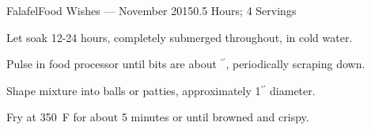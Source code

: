 \documentclass{article}
\begin{document}
\begin{recipe}{Falafel}{Food Wishes --- November 2015}{0.5 Hours; 4 Servings}

   Let soak 12-24 hours, completely submerged throughout, in cold water.

   Pulse in food processor until bits are about $^{\prime\prime}$,
   periodically scraping down.

   \newstep
   Shape mixture into balls or patties, approximately 1$^{\prime\prime}$
   diameter. 

   \newstep
   Fry at 350\ \0F for about 5 minutes or until browned and crispy.

\end{recipe}
\end{document}
